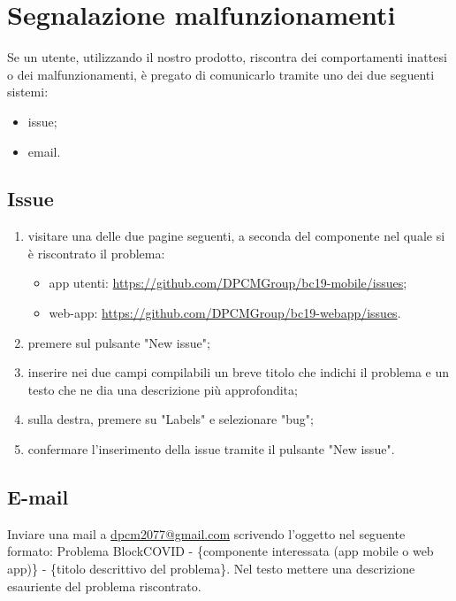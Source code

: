 \section{Segnalazione malfunzionamenti}
Se un utente, utilizzando il nostro prodotto, riscontra dei comportamenti inattesi o dei malfunzionamenti, è pregato di comunicarlo tramite uno dei due seguenti sistemi:
\begin{itemize}
	\item issue;
	\item email.
\end{itemize}
\subsection{Issue}
\begin{enumerate}
	\item visitare una delle due pagine seguenti, a seconda del componente nel quale si è riscontrato il problema:
	\begin{itemize}
		\item app utenti: \url{https://github.com/DPCMGroup/bc19-mobile/issues};
		\item web-app: \url{https://github.com/DPCMGroup/bc19-webapp/issues}.
	\end{itemize}
	\item premere sul pulsante "New issue";
	\item inserire nei due campi compilabili un breve titolo che indichi il problema e un testo che ne dia una descrizione più approfondita;
	\item sulla destra, premere su "Labels" e selezionare "bug";
	\item confermare l'inserimento della issue tramite il pulsante "New issue".
\end{enumerate}
\subsection{E-mail}
Inviare una mail a \href{mailto:dpcm2077@gmail.com}{dpcm2077@gmail.com} scrivendo l'oggetto nel seguente formato: \newline
Problema BlockCOVID - \{componente interessata (app mobile o web app)\} - \{titolo descrittivo del problema\}. \newline
Nel testo mettere una descrizione esauriente del problema riscontrato.